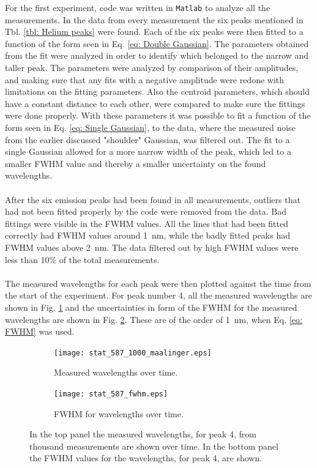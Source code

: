 For the first experiment, code was written in \texttt{Matlab} to analyze all the measurements. In the data from every measurement the six peaks mentioned in Tbl. \ref{tbl: Helium peaks} were found. Each of the six peaks were then fitted to a function of the form seen in Eq. \ref{eq: Double Gaussian}. The parameters obtained from the fit were analyzed in order to identify which belonged to the narrow and taller peak. The parameters were analyzed by comparison of their amplitudes, and making sure that any fits with a negative amplitude were redone with limitations on the fitting parameters. Also the centroid parameters, which should have a constant distance to each other, were compared to make sure the fittings were done properly. With these parameters it was possible to fit a function of the form seen in Eq. \ref{eq: Single Gaussian}, to the data, where the measured noise from the earlier discussed "shoulder" Gaussian, was filtered out. The fit to a single Gaussian allowed for a more narrow width of the peak, which led to a smaller FWHM value and thereby a smaller uncertainty on the found wavelengths.
\\
\\
After the six emission peaks had been found in all measurements, outliers that had not been fitted properly by the code were removed from the data. Bad fittings were visible in the FWHM values. All the lines that had been fitted correctly had FWHM values around \SI{1}{nm}, while the badly fitted peaks had FWHM values above \SI{2}{nm}. The data filtered out by high FWHM values were less than \num{10}\% of the total measurements.
\\
\\
The measured wavelengths for each peak were then plotted against the time from the start of the experiment. For peak number 4, all the measured wavelengths are shown in Fig. \ref{fig: exp1 1000 maalinger} and the uncertainties in form of the FWHM for the measured wavelengths are shown in Fig. \ref{fig: exp1 1000 fwhm}. These are of the order of \SI{1}{nm}, when Eq. \ref{eq: FWHM} was used.


\begin{figure}[h!]
\centering
\begin{subfigure}{.9\textwidth}
\centering
\texttt{[image: stat\_587\_1000\_maalinger.eps]}
\caption{Measured wavelengths over time.}
\label{fig: exp1 1000 maalinger}
\end{subfigure}
\begin{subfigure}{.9\textwidth}
\centering
\texttt{[image: stat\_587\_fwhm.eps]}
\caption{FWHM for wavelengths over time.}
\label{fig: exp1 1000 fwhm}
\end{subfigure}
\caption{In the top panel the measured wavelengths, for peak 4, from thousand measurements are shown over time. In the bottom panel the FWHM values for the wavelengths, for peak 4, are shown. }
\label{fig: Exp1 1000 samlet}
\end{figure}

